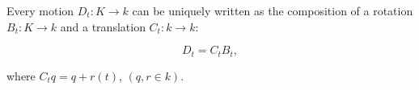 Every motion $D_t: K \to k$ can be uniquely written as the composition of a rotation $B_t: K \to k$ and a translation $C_t: k \to k$:

$$D_t = C_t B_t,$$

where $C_t q = q + r(t)$, $(q, r \in k)$.
